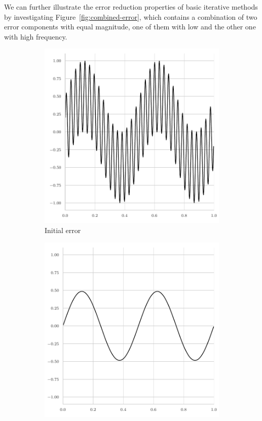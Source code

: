 We can further illustrate the error reduction properties of basic iterative methods by investigating Figure~\ref{fig:combined-error}, which contains a combination of two error components with equal magnitude, one of them with low and the other one with high frequency.
\begin{figure}
	\begin{subfigure}[t]{0.32\textwidth}
	\centering
		\includegraphics[width=\textwidth]{figures/error_plots//initial_error_jacobi_combined.pdf}
		\caption{Initial error}
\end{subfigure}
\hfill
\begin{subfigure}[t]{0.32\textwidth}
	\centering
		\includegraphics[width=\textwidth]{figures/error_plots//final_error_jacobi_combined.pdf}

\end{subfigure}
\end{figure}
